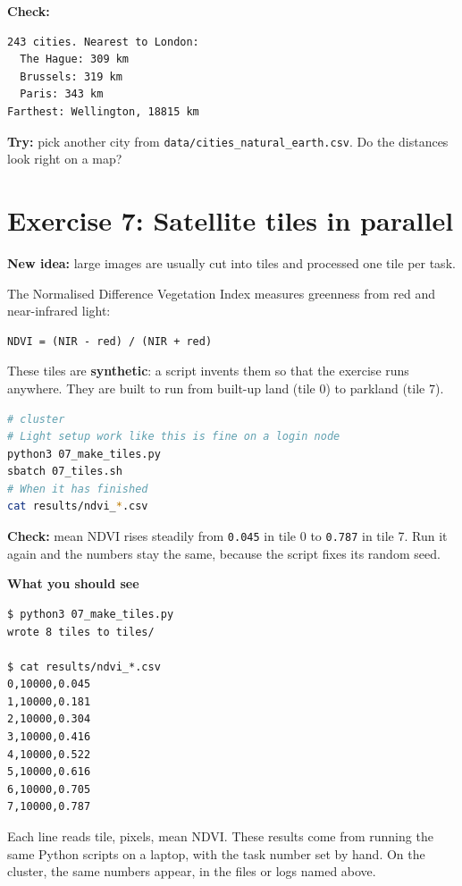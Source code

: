 \textbf{Check:}

\begin{lstlisting}[language=text]
243 cities. Nearest to London:
  The Hague: 309 km
  Brussels: 319 km
  Paris: 343 km
Farthest: Wellington, 18815 km
\end{lstlisting}

\textbf{Try:} pick another city from \texttt{data/cities\_natural\_earth.csv}. Do the distances look right on a map?

\section{Exercise 7: Satellite tiles in parallel}\label{exercise-7-satellite-tiles-in-parallel}

\textbf{New idea:} large images are usually cut into tiles and processed one tile per task.

The Normalised Difference Vegetation Index measures greenness from red and near-infrared light:

\begin{lstlisting}[language=text]
NDVI = (NIR - red) / (NIR + red)
\end{lstlisting}

These tiles are \textbf{synthetic}: a script invents them so that the exercise runs anywhere. They are built to run from built-up land (tile 0) to parkland (tile 7).

\begin{lstlisting}[language=bash]
# cluster
# Light setup work like this is fine on a login node
python3 07_make_tiles.py
sbatch 07_tiles.sh
# When it has finished
cat results/ndvi_*.csv
\end{lstlisting}

\textbf{Check:} mean NDVI rises steadily from \texttt{0.045} in tile 0 to \texttt{0.787} in tile 7. Run it again and the numbers stay the same, because the script fixes its random seed.

\textbf{What you should see}

\begin{lstlisting}[language=text]
$ python3 07_make_tiles.py
wrote 8 tiles to tiles/

$ cat results/ndvi_*.csv
0,10000,0.045
1,10000,0.181
2,10000,0.304
3,10000,0.416
4,10000,0.522
5,10000,0.616
6,10000,0.705
7,10000,0.787
\end{lstlisting}

Each line reads tile, pixels, mean NDVI. These results come from running the same Python scripts on a laptop, with the task number set by hand. On the cluster, the same numbers appear, in the files or logs named above.

